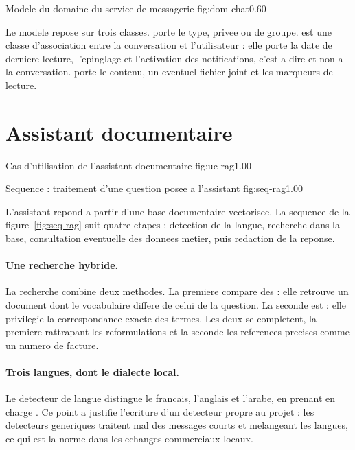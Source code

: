   {Modele du domaine du service de messagerie}
  {fig:dom-chat}{0.60}

Le modele repose sur trois classes.  porte le type,
privee ou de groupe.  est une classe d'association
entre la conversation et l'utilisateur : elle porte la date de derniere
lecture, l'epinglage et l'activation des notifications, c'est-a-dire
 et non a la conversation.
 porte le contenu, un eventuel fichier joint et les
marqueurs de lecture.

\section{Assistant documentaire}

  {Cas d'utilisation de l'assistant documentaire}
  {fig:uc-rag}{1.00}

  {Sequence : traitement d'une question posee a l'assistant}
  {fig:seq-rag}{1.00}

L'assistant repond a partir d'une base documentaire vectorisee. La
sequence de la figure~\ref{fig:seq-rag} suit quatre etapes : detection de
la langue, recherche dans la base, consultation eventuelle des donnees
metier, puis redaction de la reponse.

\paragraph{Une recherche hybride.}
La recherche combine deux methodes. La premiere compare des
 : elle retrouve un document dont le
vocabulaire differe de celui de la question. La seconde est
 : elle privilegie la correspondance exacte des
termes. Les deux se completent, la premiere rattrapant les reformulations
et la seconde les references precises comme un numero de facture.

\paragraph{Trois langues, dont le dialecte local.}
Le detecteur de langue distingue le francais, l'anglais et l'arabe, en
prenant en charge . Ce point a justifie l'ecriture d'un detecteur propre
au projet : les detecteurs generiques traitent mal des messages courts et
melangeant les langues, ce qui est la norme dans les echanges
commerciaux locaux.

